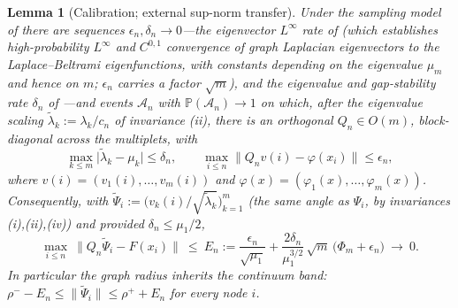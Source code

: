 \documentclass[11pt]{article}
\newtheorem{lemma}[theorem]{Lemma}
\theoremstyle{remark}
\begin{document}
\begin{lemma}[Calibration; external sup-norm transfer]\label{lem:transfer}
Under the sampling model of \cite{calder2022,calderlewicka2022} there are sequences
$\epsilon_n,\delta_n\to0$---the eigenvector $L^\infty$ rate of
\cite{calderlewicka2022} (which establishes high-probability $L^\infty$ and
$C^{0,1}$ convergence of graph Laplacian eigenvectors to the Laplace--Beltrami
eigenfunctions, with constants depending on the eigenvalue $\mu_m$ and hence on
$m$; $\epsilon_n$ carries a factor $\sqrt m$), and the eigenvalue and
gap-stability rate $\delta_n$ of \cite{calder2022}---and events $\mathcal A_n$
with $\mathbb P(\mathcal A_n)\to1$ on which, after the eigenvalue scaling
$\tilde\lambda_k:=\lambda_k/c_n$ of invariance (ii), there is an orthogonal
$Q_n\in O(m)$, block-diagonal across the multiplets, with
\[
\max_{k\le m}\big|\tilde\lambda_k-\mu_k\big|\le\delta_n,
\qquad
\max_{i\le n}\big\lVert Q_n v(i)-\varphi(x_i)\big\rVert\le\epsilon_n,
\]
where $v(i)=(v_1(i),\dots,v_m(i))$ and
$\varphi(x)=(\varphi_1(x),\dots,\varphi_m(x))$. Consequently, with
$\widetilde\Psi_i:=\big(v_k(i)/\sqrt{\tilde\lambda_k}\big)_{k=1}^m$ (the same
angle as $\Psi_i$, by invariances (i),(ii),(iv)) and provided $\delta_n\le\mu_1/2$,
\[
\max_{i\le n}\ \big\lVert Q_n\widetilde\Psi_i-F(x_i)\big\rVert\ \le\ E_n
:=\frac{\epsilon_n}{\sqrt{\mu_1}}
+\frac{2\delta_n}{\mu_1^{3/2}}\,\sqrt m\,\big(\Phi_m+\epsilon_n\big)
\ \longrightarrow\ 0 .
\]
In particular the graph radius inherits the continuum band:
$\rho^--E_n\le\lVert\widetilde\Psi_i\rVert\le\rho^++E_n$ for every node $i$.
\end{lemma}
\end{document}
